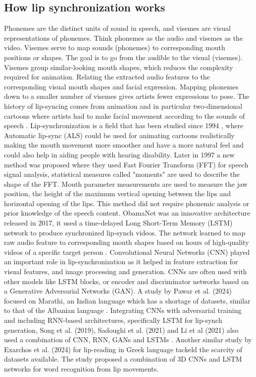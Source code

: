 \documentclass[12pt]{article}
\begin{document}
\subsection{How lip synchronization works}
Phonemes are the distinct units of sound in speech, and visemes are visual representations of phonemes. Think phonemes as the audio and visemes as the video. Visemes serve to map sounds (phonemes) to corresponding mouth positions or shapes. The goal is to go from the audible  to the visual (visemes). Visemes group similar-looking mouth shapes, which reduces the complexity required for animation. Relating the extracted audio features to the corresponding visual mouth shapes and facial expression. Mapping phonemes down to a smaller number of visemes gives artists fewer expressions to pose. The history of lip-syncing comes from animation and in particular two-dimensional cartoons where artists had to make facial movement according to the sounds of speech \cite{game-lipsynch}. Lip-synchronization is a field that has been studied since 1994 \cite{earliest-lip-synch}, where Automatic lip-sync (ALS) could be used for animating cartoons realistically making the mouth movement more smoother and have a more natural feel and could also help in aiding people with hearing disability. Later in 1997 a new method was proposed where they used Fast Fourier Transform (FFT) for speech signal analysis, statistical measures called "moments" are used to describe the shape of the FFT. Mouth parameter measurements are used to measure the jaw position, the height of the maximum vertical opening between the lips and horizontal opening of the lips. This method did not require phonemic analysis or prior knowledge of the speech content. ObamaNet was an innovative architecture released in 2017, it used a time-delayed Long Short-Term Memory (LSTM) network to produce synchronized lip-synch videos. The network learned to map raw audio feature to corresponding mouth shapes based on hours of high-quality videos of a specific target person \cite{ObamaNet}. Convolutional Neural Networks (CNN) played an important role in lip-synchronization as it helped in feature extraction for visual features, and image processing and generation. CNNs are often used with other models like LSTM blocks, or encoder and discriminator networks based on a Generative Adversarial Networks (GAN). A study by Pawar et al. (2024) focused on Marathi, an Indian language which has a shortage of datasets, similar to that of the Albanian language \cite{PAWAR2024100084}. Integrating CNNs with adversarial training and including RNN-based architectures, specifically LSTM for lip-synch generation, Song et al. (2019), Sadoughi et al. (2021) and Li et al (2021) also used a combination of CNN, RNN, GANs and LSTMs \cite{Audio-driven-facial-animation} \cite{Li_2021}. Another similar study by Exarchos et al. (2024) for lip-reading in Greek language tackeld the scarcity of datasets available. The study proposed a combination of 3D CNNs and LSTM networks for word recognition from lip movements.  
\end{document}
